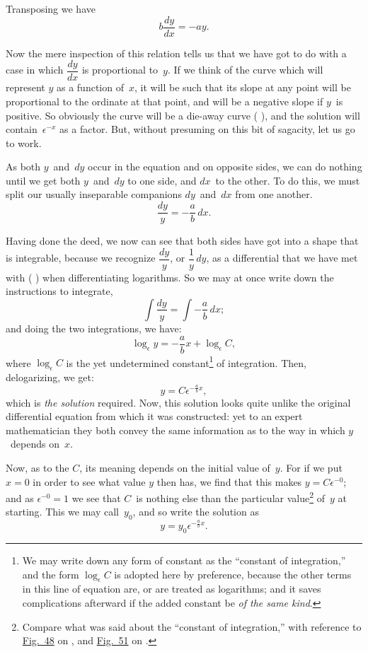 \documentclass[12pt]{book}[2005/09/16]
\newcommand{\DPPageSep}[2]{\Pagelabel{#2}}
\newcommand{\Pagelabel}[1]
  {\phantomsection\label{#1}}
\newcommand{\Pageref}[2][p.]{%
  \ifthenelse{\not\equal{#1}{}}{%
    \hyperref[#2]{#1~\pageref{#2}}%
  }{%
    \hyperref[#2]{\pageref{#2}}%
  }%
}
\newcommand{\Fig}[1]{\hyperref[fig:#1]{Fig.~#1}}
\newcommand{\efrac}[2]{\frac{#1}{#2}}
\begin{document}
Transposing we have
\[
b \frac{dy}{dx} = -ay.
\]
\DPPageSep{247.png}{235}%

Now the mere inspection of this relation tells us
that we have got to do with a case in which $\dfrac{dy}{dx}$ is
proportional to~$y$. If we think of the curve which
will represent $y$ as a function of~$x$, it will be such
that its slope at any point will be proportional to
the ordinate at that point, and will be a negative
slope if $y$~is positive. So obviously the curve will
be a die-away curve (\Pageref{section:5}), and the solution will
contain~$\epsilon^{-x}$ as a factor. But, without presuming on
this bit of sagacity, let us go to work.

As both $y$~and~$dy$ occur in the equation and on
opposite sides, we can do nothing until we get both
$y$~and~$dy$ to one side, and $dx$~to the other. To do
this, we must split our usually inseparable companions
$dy$~and~$dx$ from one another.
\[
\frac{dy}{y} = - \frac{a}{b}\, dx.
\]

Having done the deed, we now can see that both
sides have got into a shape that is integrable, because
we recognize $\dfrac{dy}{y}$, or $\dfrac{1}{y}\, dy$, as a differential that we
have met with (\Pageref{expolo}) when differentiating logarithms.
So we may at once write down the instructions to
integrate,
\[
\int \frac{dy}{y} = \int -\frac{a}{b}\, dx;
\]
and doing the two integrations, we have:
\[
\log_\epsilon y = -\frac{a}{b} x + \log_\epsilon C,
\]
\DPPageSep{248.png}{236}%
where $\log_\epsilon C$ is the yet undetermined constant\footnote
  {We may write down any form of constant as the ``constant of
  integration,'' and the form $\log_\epsilon C$ is adopted here by preference,
  because the other terms in this line of equation are, or are treated
  as logarithms; and it saves complications afterward if the added
  constant be \emph{of the same kind}.}
of
integration. Then, delogarizing, we get:
\[
y = C \epsilon^{-\efrac{a}{b} x},
\]
which is \emph{the solution} required. Now, this solution
looks quite unlike the original differential equation
from which it was constructed: yet to an expert
mathematician they both convey the same information
as to the way in which $y$~depends on~$x$.

Now, as to the $C$, its meaning depends on the
initial value of~$y$. For if we put $x = 0$ in order to
see what value $y$ then has, we find that this makes
$y = C \epsilon^{-0}$; and as $\epsilon^{-0} = 1$ we see that $C$~is nothing else
than the particular value\footnote
  {Compare what was said about the ``constant of integration,''
  with reference to \Fig{48} on \Pageref{constant}, and \Fig{51} on \Pageref{fig:51}.}
 of~$y$ at starting. This we
may call~$y_0$, and so write the solution as
\[
y = y_0 \epsilon^{-\efrac{a}{b} x}.
\]
\end{document}

